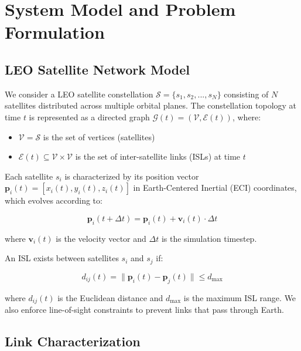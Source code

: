 
\section{System Model and Problem Formulation}

\subsection{LEO Satellite Network Model}

We consider a LEO satellite constellation $\mathcal{S} = \{s_1, s_2, ..., s_N\}$ consisting of $N$ satellites distributed across multiple orbital planes. The constellation topology at time $t$ is represented as a directed graph $\mathcal{G}(t) = (\mathcal{V}, \mathcal{E}(t))$, where:

\begin{itemize}
\item $\mathcal{V} = \mathcal{S}$ is the set of vertices (satellites)
\item $\mathcal{E}(t) \subseteq \mathcal{V} \times \mathcal{V}$ is the set of inter-satellite links (ISLs) at time $t$
\end{itemize}

Each satellite $s_i$ is characterized by its position vector $\mathbf{p}_i(t) = [x_i(t), y_i(t), z_i(t)]$ in Earth-Centered Inertial (ECI) coordinates, which evolves according to:

\begin{equation}
\mathbf{p}_i(t + \Delta t) = \mathbf{p}_i(t) + \mathbf{v}_i(t) \cdot \Delta t
\end{equation}

where $\mathbf{v}_i(t)$ is the velocity vector and $\Delta t$ is the simulation timestep.

An ISL exists between satellites $s_i$ and $s_j$ if:

\begin{equation}
d_{ij}(t) = \|\mathbf{p}_i(t) - \mathbf{p}_j(t)\| \leq d_{\max}
\end{equation}

where $d_{ij}(t)$ is the Euclidean distance and $d_{\max}$ is the maximum ISL range. We also enforce line-of-sight constraints to prevent links that pass through Earth.

\subsection{Link Characterization}


